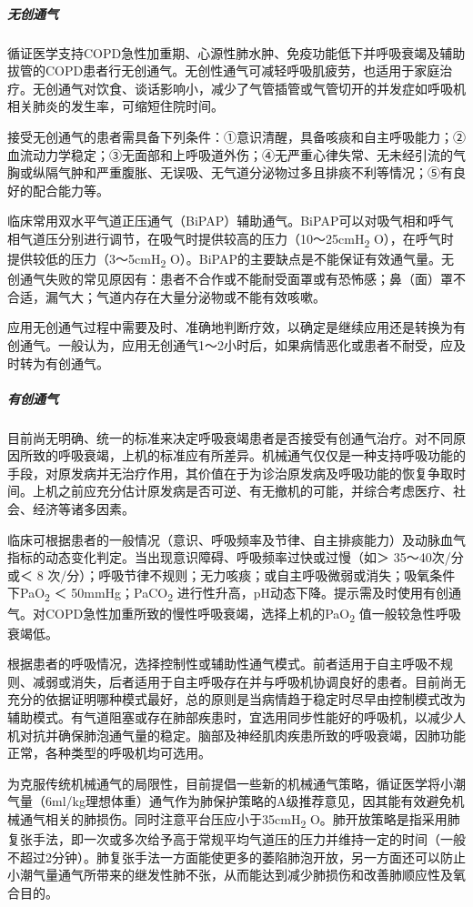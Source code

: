 \subparagraph{无创通气}

循证医学支持COPD急性加重期、心源性肺水肿、免疫功能低下并呼吸衰竭及辅助拔管的COPD患者行无创通气。无创性通气可减轻呼吸肌疲劳，也适用于家庭治疗。无创通气对饮食、谈话影响小，减少了气管插管或气管切开的并发症如呼吸机相关肺炎的发生率，可缩短住院时间。

接受无创通气的患者需具备下列条件：①意识清醒，具备咳痰和自主呼吸能力；②血流动力学稳定；③无面部和上呼吸道外伤；④无严重心律失常、无未经引流的气胸或纵隔气肿和严重腹胀、无误吸、无气道分泌物过多且排痰不利等情况；⑤有良好的配合能力等。

临床常用双水平气道正压通气（BiPAP）辅助通气。BiPAP可以对吸气相和呼气相气道压分别进行调节，在吸气时提供较高的压力（10～25cmH\textsubscript{2}
O），在呼气时提供较低的压力（3～5cmH\textsubscript{2}
O）。BiPAP的主要缺点是不能保证有效通气量。无创通气失败的常见原因有：患者不合作或不能耐受面罩或有恐怖感；鼻（面）罩不合适，漏气大；气道内存在大量分泌物或不能有效咳嗽。

应用无创通气过程中需要及时、准确地判断疗效，以确定是继续应用还是转换为有创通气。一般认为，应用无创通气1～2小时后，如果病情恶化或患者不耐受，应及时转为有创通气。

\subparagraph{有创通气}

目前尚无明确、统一的标准来决定呼吸衰竭患者是否接受有创通气治疗。对不同原因所致的呼吸衰竭，上机的标准应有所差异。机械通气仅仅是一种支持呼吸功能的手段，对原发病并无治疗作用，其价值在于为诊治原发病及呼吸功能的恢复争取时间。上机之前应充分估计原发病是否可逆、有无撤机的可能，并综合考虑医疗、社会、经济等诸多因素。

临床可根据患者的一般情况（意识、呼吸频率及节律、自主排痰能力）及动脉血气指标的动态变化判定。当出现意识障碍、呼吸频率过快或过慢（如＞
35～40次/分或＜ 8
次/分）；呼吸节律不规则；无力咳痰；或自主呼吸微弱或消失；吸氧条件下PaO\textsubscript{2}
＜ 50mmHg；PaCO\textsubscript{2}
进行性升高，pH动态下降。提示需及时使用有创通气。对COPD急性加重所致的慢性呼吸衰竭，选择上机的PaO\textsubscript{2}
值一般较急性呼吸衰竭低。

根据患者的呼吸情况，选择控制性或辅助性通气模式。前者适用于自主呼吸不规则、减弱或消失，后者适用于自主呼吸存在并与呼吸机协调良好的患者。目前尚无充分的依据证明哪种模式最好，总的原则是当病情趋于稳定时尽早由控制模式改为辅助模式。有气道阻塞或存在肺部疾患时，宜选用同步性能好的呼吸机，以减少人机对抗并确保肺泡通气量的稳定。脑部及神经肌肉疾患所致的呼吸衰竭，因肺功能正常，各种类型的呼吸机均可选用。

为克服传统机械通气的局限性，目前提倡一些新的机械通气策略，循证医学将小潮气量（6ml/kg理想体重）通气作为肺保护策略的A级推荐意见，因其能有效避免机械通气相关的肺损伤。同时注意平台压应小于35cmH\textsubscript{2}
O。肺开放策略是指采用肺复张手法，即一次或多次给予高于常规平均气道压的压力并维持一定的时间（一般不超过2分钟）。肺复张手法一方面能使更多的萎陷肺泡开放，另一方面还可以防止小潮气量通气所带来的继发性肺不张，从而能达到减少肺损伤和改善肺顺应性及氧合目的。


